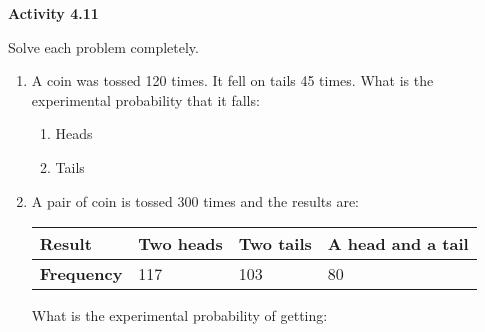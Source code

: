  \vspace{0.3ex}
\noindent\textbf{Activity 4.11}

\vspace{0.2ex}

Solve each problem completely.

\begin{enumerate} 
\item A coin was tossed 120 times. It fell on tails 45 times. What is the experimental probability that it falls: 
\begin{multicols}{2}
\begin{enumerate}
\item  Heads
\item  Tails
\end{enumerate}   
\end{multicols}
\item A pair of coin is tossed 300 times and the results are:

\begin{center}
\noindent\begin{minipage}{0.45\textwidth}
\begin{tabularx}{\textwidth}{|Y|Y|Y|Y|}
\hline
\textbf{Result} & Two heads & Two tails & A head and a tail\\
\hline
\textbf{Frequency} & 117 & 103 & 80\\
\hline
\end{tabularx} 
\end{minipage}
\end{center} 

What is the experimental probability of getting: 
\begin{enumerate}
\end{enumerate} 


\end{enumerate}
